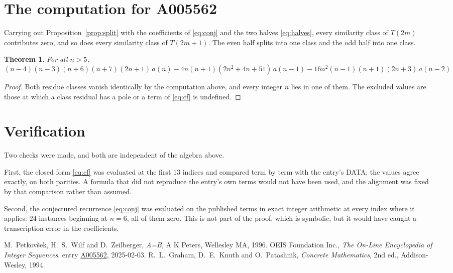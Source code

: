 \documentclass[11pt,a4paper]{article}
\theoremstyle{plain}
\newtheorem{theorem}{Theorem}
\theoremstyle{definition}
\begin{document}
\section{The computation for A005562}

Carrying out Proposition~\ref{prop:split} with the coefficients of \eqref{eq:conj} and the
two halves \eqref{eq:halves}, every similarity class of $T(2m)$ contributes zero, and so
does every similarity class of $T(2m+1)$. The even half splits into one class
and the odd half into one class.

\begin{theorem}
For all $n> 5$,
\[
\left(n - 4\right) \left(n - 3\right) \left(n + 6\right) \left(n + 7\right) \left(2 n + 1\right)\,a(n) -  4 n \left(n + 1\right) \left(2 n^{2} + 4 n + 51\right)\,a(n-1) -  16 n^{2} \left(n - 1\right) \left(n + 1\right) \left(2 n + 3\right)\,a(n-2)
\]
\end{theorem}

\begin{proof}
Both residue classes vanish identically by the computation above, and every integer $n$
lies in one of them. The excluded values are those at which a class residual has a pole or
a term of \eqref{eq:cf} is undefined.
\end{proof}

\section{Verification}

Two checks were made, and both are independent of the algebra above.

First, the closed form \eqref{eq:cf} was evaluated at the first $13$ indices and
compared term by term with the entry's DATA; the values agree exactly, on both parities. A
formula that did not reproduce the entry's own terms would not have been used, and the
alignment was fixed by that comparison rather than assumed.

Second, the conjectured recurrence \eqref{eq:conj} was evaluated on the published terms in
exact integer arithmetic at every index where it applies: $24$ instances beginning at
$n=6$, all of them zero. This is not part of the proof, which is symbolic, but it
would have caught a transcription error in the coefficients.

\begin{thebibliography}{9}
 M.~Petkov\v{s}ek, H.~S.~Wilf and D.~Zeilberger, \emph{A=B}, A K Peters,
Wellesley MA, 1996.
 OEIS Foundation Inc., \emph{The On-Line Encyclopedia of Integer Sequences},
entry \href{https://oeis.org/A005562}{A005562}, 2025-02-03.
 R.~L.~Graham, D.~E.~Knuth and O.~Patashnik, \emph{Concrete Mathematics},
2nd ed., Addison-Wesley, 1994.
\end{thebibliography}
\end{document}
